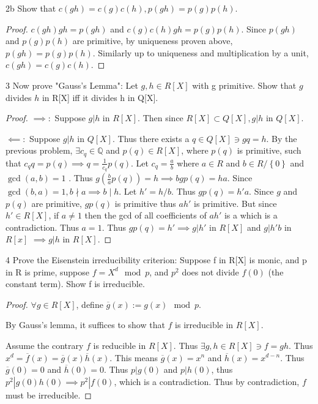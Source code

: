 \documentclass{article}
\newcommand{\Q}{\mathbb{Q}}
\begin{document}
\begin{PROB}{2b}\label{Problem 2b.}
    Show that $c(gh) = c(g)c(h), p(gh) = p(g)p(h)$.
\end{PROB}
\begin{proof}
    $c(gh) gh = p(gh)$ and $c(g) c(h) gh = p(g)p(h)$. Since $p(gh)$ and $p(g)p(h)$ are primitive, by uniqueness proven above, $p(gh) = p(g)p(h)$. Similarly up to uniqueness and multiplication by a unit, $c(gh) = c(g) c(h)$.       
\end{proof}

\bigskip

\begin{PROB}{3}\label{Problem 3.}
    Now prove "Gauss's Lemma": Let $g, h \in R[X]$  with g primitive. Show that $g$  divides $h$  in R[X] iff it divides h in Q[X]. 
\end{PROB}
\begin{proof}
    $\implies:$ Suppose $g | h$ in $R[X]$. Then since $R[X] \subset Q[X], g | h$ in $Q[X]$. 
    
    $\impliedby:$ Suppose $g | h$ in $Q[X]$. Thus there exists a $q \in Q[X] \ni gq = h$. By the previous problem, $\exists c_q \in \Q$ and $p(q) \in R[X]$, where $p(q)$ is primitive, such that $c_q q = p(q) \implies q = \frac{1}{c_q} p(q)$. Let $c_q = \frac{a}{b}$ where $a \in R$ and $b \in R / \left\{ 0 \right\}$ and $\gcd(a, b) = 1$ . Thus $g (\frac{b}{a} p(q)) = h \implies bgp(q) = ha$. Since $\gcd(b, a) = 1, b \nmid a  \implies b \mid h$. Let $h' = h / b$. Thus $g p(q) = h' a$. Since $g$ and $p(q)$ are primitive, $g p(q)$ is primitive thus $ah'$ is primitive. But since $h' \in R[X]$, if $a \neq 1$ then the gcd of all coefficients of $ah'$ is a which is a contradiction. Thus $a = 1$. Thus $g p(q) = h' \implies g | h'$ in $R[X]$ and $g | h'b$ in $R[x]$  $\implies g | h$ in $R[X]$.                              
\end{proof}

\bigskip

\begin{PROB}{4}\label{Problem 4.}
    Prove the Eisenstein irreducibility criterion:  Suppose f in R[X] is monic, and p in R is prime, suppose $f = X^d \mod p$, and $p^2$ does not divide $f(0)$ (the constant term). Show f is irreducible. 
\end{PROB}
\begin{proof}
    $\forall g \in R[X]$, define $\overline{g}(x) := g(x) \mod p$.   

    By Gauss's lemma, it suffices to show that $f$ is irreducible in $R[X]$.

    Assume the contrary $f$ is reducible in $R[X]$. Thus $\exists g, h \in R[X] \ni f = gh$. Thus $x^d = \overline{f}(x) = \overline{g}(x) \overline{h}(x)$. This means $\overline{g}(x) = x^n$ and $\overline{h}(x) = x^{d - n}$. Thus $\overline{g}(0) = 0$ and $\overline{h}(0) = 0$. Thus $p | g(0)$ and $p | h(0)$, thus $p^2 | g(0)h(0) \implies p^2 | f(0)$, which is a contradiction. Thus by contradiction, $f$ must be irreducible.                 
\end{proof}
\end{document}
